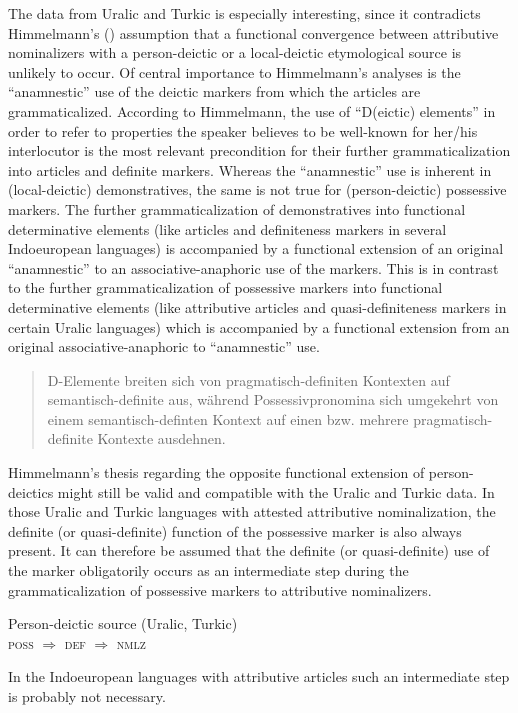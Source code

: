 {The data from Uralic and Turkic is especially interesting, since it contradicts Himmelmann's (\citeyear[220–221]{himmelmann1997}) assumption that a functional convergence between attributive nominalizers with a person-deictic or a local-deictic etymological source is unlikely to occur. Of central importance to Himmelmann's analyses is the “anamnestic” use of the deictic markers from which the articles are grammaticalized. According to Himmelmann, the use of “D(eictic) elements” in order to refer to properties the speaker believes to be well-known for her/his interlocutor is the most relevant precondition for their further grammaticalization into articles and definite markers. Whereas the “anamnestic” use is inherent in (local-deictic) demonstratives, the same is not true for (person-deictic) possessive markers. The further grammaticalization of demonstratives into functional determinative elements (like articles and definiteness markers in several Indoeuropean languages) is accompanied by a functional extension of an original “anamnestic” to an associative-anaphoric use of the markers. This is in contrast to the further grammaticalization of possessive markers into functional determinative elements (like attributive articles and quasi-definiteness markers in certain Uralic languages) which is accompanied by a functional extension from an original associative-anaphoric to “anamnestic” use.
\begin{quote}
D-Elemente breiten sich von pragmatisch-definiten Kontexten auf semantisch-definite aus, während Possessivpronomina sich umgekehrt von einem semantisch-definten Kontext auf einen bzw. mehrere pragmatisch-definite Kontexte ausdehnen. \citep[221]{himmelmann1997}
\end{quote}
Himmelmann's thesis regarding the opposite functional extension of person-deictics might still be valid and compatible with the Uralic and Turkic data. In those Uralic and Turkic languages with attested attributive nominalization, the definite (or quasi-definite) function of the possessive marker is also always present. It can therefore be assumed that the definite (or quasi-definite) use of the marker obligatorily occurs as an intermediate step during the grammaticalization of possessive markers to attributive nominalizers.
\begin{exe}
\ex Person-deictic source (Uralic, Turkic)\\
\textsc{poss $\Rightarrow$ def $\Rightarrow$ nmlz}
\end{exe}
In the Indoeuropean languages with attributive articles such an intermediate step is probably not necessary.
}
